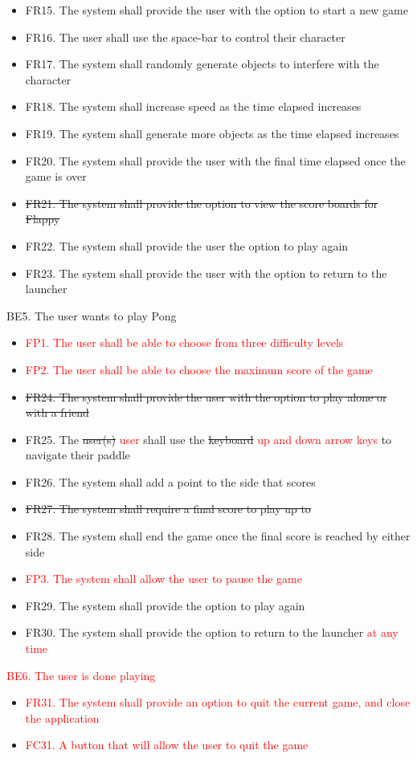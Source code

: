 \documentclass[12pt, titlepage]{article}
\begin{document}
    \begin{itemize}
        \item FR15. The system shall provide the user with the option to start a new game
        \item FR16. The user shall use the space-bar to control their character
        \item FR17. The system shall randomly generate objects to interfere with the character
        \item FR18. The system shall increase speed as the time elapsed increases
        \item FR19. The system shall generate more objects as the time elapsed increases
        \item FR20. The system shall provide the user with the final time elapsed once the game is over
        \item \sout{FR21. The system shall provide the option to view the score boards for Flappy}
        \item FR22. The system shall provide the user the option to play again
        \item FR23. The system shall provide the user with the option to return to the launcher
    \end{itemize}
    BE5. The user wants to play Pong
    \begin{itemize}
        \item \textcolor{red}{FP1. The user shall be able to choose from three difficulty levels}
        \item \textcolor{red}{FP2. The user shall be able to choose the maximum score of the game}
        \item \sout{FR24. The system shall provide the user with the option to play alone or with a friend}
        \item FR25. The \sout{user(s)} \textcolor{red}{user} shall use the \sout{keyboard} \textcolor{red}{up and down arrow keys} to navigate their paddle
        \item FR26. The system shall add a point to the side that scores
        \item \sout{FR27. The system shall require a final score to play up to}
        \item FR28. The system shall end the game once the final score is reached by either side
        \item \textcolor{red}{FP3. The system shall allow the user to pause the game}
        \item FR29. The system shall provide the option to play again
        \item FR30. The system shall provide the option to return to the launcher \textcolor{red}{at any time}
    \end{itemize}
    \textcolor{red}{BE6. The user is done playing}
    \begin{itemize}
        \item \textcolor{red}{FR31. The system shall provide an option to quit the current game, and close the application}
        \item \textcolor{red}{FC31. A button that will allow the user to quit the game}
    \end{itemize}
\end{document}
